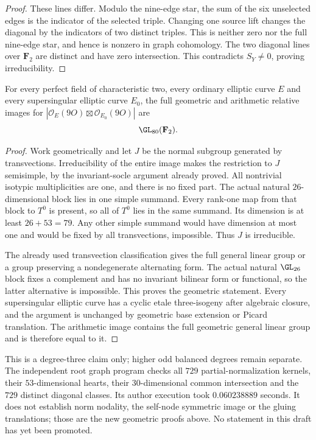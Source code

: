 \begin{proof}
These lines differ. Modulo the nine-edge star, the sum of
the six unselected edges is the indicator of the selected
triple. Changing one source lift changes the diagonal by
the indicators of two distinct triples. This is neither
zero nor the full nine-edge star, and hence is nonzero in
graph cohomology. The two diagonal lines over $\mathbf F_2$
are distinct and have zero intersection. This contradicts
$S_Y\ne0$, proving irreducibility.
\end{proof}

\begin{theorem}
\label{thm:mixed-every-fixed-modulus-degree-three-candidate}
For every perfect field of characteristic two, every ordinary
elliptic curve $E$ and every supersingular elliptic curve $E_0$,
the full geometric and arithmetic relative images for
$|\mathcal O_E(9O)\boxtimes\mathcal O_{E_0}(9O)|$ are
\[
                         \GL_{80}(\mathbf F_2).
\]
\end{theorem}
\begin{proof}
Work geometrically and let $J$ be the normal subgroup generated
by transvections. Irreducibility of the entire image makes
the restriction to $J$ semisimple, by the invariant-socle
argument already proved. All nontrivial isotypic multiplicities
are one, and there is no fixed part. The actual natural
$26$-dimensional block lies in one simple summand. Every
rank-one map from that block to $T^0$ is present, so all of
$T^0$ lies in the same summand. Its dimension is at least
$26+53=79$. Any other simple summand would have dimension at
most one and would be fixed by all transvections, impossible.
Thus $J$ is irreducible.

The already used transvection classification
\cite[Theorem~3.6, printed p.~22]{KantorSeress2001} gives the
full general linear group or a group preserving a nondegenerate
alternating form. The actual natural $\GL_{26}$ block fixes
a complement and has no invariant bilinear form or functional,
so the latter alternative is impossible. This proves the
geometric statement. Every supersingular elliptic curve has
a cyclic etale three-isogeny after algebraic closure, and
the argument is unchanged by geometric base extension or
Picard translation. The arithmetic image contains the full
geometric general linear group and is therefore equal to it.
\end{proof}

\begin{remark}
\label{rem:mixed-d3-norm-scope-candidate}
This is a degree-three claim only; higher odd balanced degrees
remain separate. The independent root graph program
checks all $729$ partial-normalization kernels, their
$53$-dimensional hearts, their $30$-dimensional common
intersection and the $729$ distinct diagonal classes.
Its author execution took $0.060238889$ seconds.
It does not establish norm nodality, the self-node symmetric
image or the gluing translations; those are the new geometric
proofs above. No statement in this draft has yet been promoted.
\end{remark}
